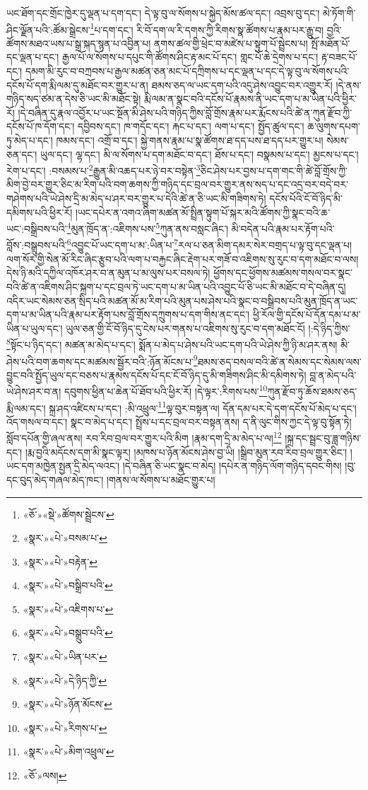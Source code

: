 ཡང་ཐོག་དང་གྲོང་ཁྱེར་དུ་ལྡན་པ་དག་དང་། དེ་ལྟ་བུ་ལ་སོགས་པ་སྐྱེད་མོས་ཚལ་དང་། འབྲས་བུ་དང་། མེ་ཏོག་གི་ཤིང་ལྗོན་པའི་:ཚོམ་སྒྲེངས་\footnote{«ཅོ་»«སྡེ་»ཚོགས་སྦྲེངས་}པ་དག་དང་། རི་བོ་དག་ལ་རི་དགས་ཀྱི་རིགས་སྣ་ཚོགས་པ་རྣམ་པར་རྒྱུ་བ། བྱའི་ཚོགས་མཐའ་ཡས་པ་སྒྲ་སྐད་སྙན་པ་འབྱིན་པ། ནགས་ཚལ་གྱི་ཕྲེང་བ་མཛེས་པ་སྟུག་པོ་སྦྲེངས་པ། སྤོ་མཐོན་པོ་དང་ལྡན་པ་དང་། རྒྱལ་པོ་ལ་སོགས་པ་དཔུང་གི་ཚོགས་ཤིང་རྟ་མང་པོ་དང་། གླང་པོ་ཆེ་དྲེགས་པ་དང་། རྟ་བཟང་པོ་དང་། དམག་མི་རུང་བ་བཀྲབས་པ་རྒྱལ་མཚན་ཅན་མང་པོ་དཀྲིགས་པ་དང་ལྡན་པ་དང་དེ་ལྟ་བུ་ལ་སོགས་པའི་དངོས་པོ་དག་རྨི་ལམ་དུ་མཐོང་བར་གྱུར་པ་ན། ཐམས་ཅད་ལ་ཡང་དག་པའི་འདུ་ཤེས་འབྱུང་བར་འགྱུར་རོ། །དེ་ནས་གཉིད་སད་ཙམ་ན་དེས་ཅི་ཡང་མི་མཐོང་སྟེ། རྨི་ལམ་ན་སྣང་བའི་དངོས་པོ་རྣམས་ནི་ཡང་དག་པ་མ་ཡིན་པའི་ཕྱིར་རོ། །དེ་བཞིན་དུ་རྣལ་འབྱོར་པ་ཡང་སྔོན་མི་ཤེས་པའི་གཉིད་ཀྱིས་བློ་གྲོས་རྣམ་པར་རྨོངས་པའི་ཚེ་ན་ཀུན་རྫོབ་ཀྱི་དངོས་པོ་ཁ་དོག་དང་། དབྱིབས་དང་། ཁ་གདོང་དང་། རྐང་པ་དང་། ལག་པ་དང་། སྤྱོད་ཚུལ་དང་། ཆ་ལུགས་དཔག་ཏུ་མེད་པ་དང་། ཁམས་དང་། འགྲོ་བ་དང་། སྐྱེ་གནས་རྣམ་པ་སྣ་ཚོགས་ཐ་དད་པས་ཐ་དད་པར་གྱུར་པ། སེམས་ཅན་དང་། ཡུལ་དང་། ལྷ་དང་། མི་ལ་སོགས་པ་དག་མཐོང་བ་དང་། ཐོས་པ་དང་། བསྣམས་པ་དང་། མྱངས་པ་དང་། རེག་པ་དང་། :བསམས་པ་\footnote{«སྣར་»«པེ་»བསམ་པ་}རྒྱུན་མི་འཆད་པར་ཉེ་བར་བསྟེན་\footnote{«སྣར་»«པེ་»བརྟེན་}ཅིང་ཤེས་པར་བྱས་པ་དག་གང་གི་ཚེ་བློ་གྲོས་ཀྱི་མིག་བྱེ་བར་གྱུར་ཅིང་མ་རིག་པའི་བག་ཆགས་ཀྱི་གཉིད་དང་བྲལ་བར་གྱུར་ནས་སད་པ་དང་འདྲ་བར་བདེ་བར་གཤེགས་པའི་ཡེ་ཤེས་དྲི་མ་མེད་པ་ཤར་བར་གྱུར་པ་དེའི་ཚེ་ན་ཅི་ཡང་མི་གཟིགས་ཏེ། དངོས་པོའི་ངོ་བོ་ཉིད་མི་དམིགས་པའི་ཕྱིར་རོ། །ཡང་དཔེར་ན་འགའ་ཞིག་མཚན་མོ་སྤྲིན་སྟུག་པོ་སྐར་མའི་ཚོགས་ཀྱི་སྣང་བའི་ཆ་ཡང་:བསྒྲིབས་པའི་\footnote{«སྣར་»«པེ་»བསྒྲིབ་པའི་}མུན་ཁྲོད་ན་:འཇིགས་པས་\footnote{«སྣར་»«པེ་»འཇིགས་པ་}ཀུན་ནས་བསླང་ཞིང་། མི་བདེན་པའི་རྣམ་པར་རྟོག་པའི་བློས་:བསྒྲུབས་པའི་\footnote{«སྣར་»«པེ་»བསྒྲུབ་པའི་}འབྱུང་པོ་ཡང་དག་པ་མ་:ཡིན་པ་\footnote{«སྣར་»«པེ་»ཡིན་པར་}རལ་པ་ཅན་མིག་དམར་སེར་བགྲད་པ་ལྟ་བུ་དང་ལྡན་པ། ལག་སོར་གྱི་སེན་མོ་རིང་ཞིང་རྩུབ་པའི་ལག་པ་བརྐྱང་ཞིང་རྡེག་པར་གཟོ་བ་འཇིགས་སུ་རུང་བ་དག་མཐོང་བ་ལས། དེས་ཉི་མའི་དཀྱིལ་འཁོར་ཤར་བ་ན་མུན་པ་མ་ལུས་པར་བསལ་ཏེ། ཕྱོགས་དང་ཕྱོགས་མཚམས་གསལ་བར་སྣང་བའི་ཚེ་ན་འཇིགས་ཤིང་སྐྲག་པ་དང་བྲལ་ཏེ་ཡང་དག་པ་མ་ཡིན་པའི་འབྱུང་པོ་ཅི་ཡང་མི་མཐོང་བ་དེ་བཞིན་དུ། འདིར་ཡང་སེམས་ཅན་སྲིད་པའི་མཚན་མོ་མ་རིག་པའི་མུན་པས་ཤེས་པའི་སྣང་བ་བསྒྲིབས་པའི་མུན་ཁྲོད་ན་ཡང་དག་པ་མ་ཡིན་པའི་རྣམ་པར་རྟོག་པས་བློ་གྲོས་དཀྲུགས་པ་དག་གིས་ནང་དང་། ཕྱི་རོལ་གྱི་དངོས་པོ་དོན་དམ་པ་མ་ཡིན་པ་ཡུལ་དང་། ཡུལ་ཅན་གྱི་ངོ་བོ་ཉིད་དུ་ངེས་པར་གནས་པ་འཇིགས་སུ་རུང་བ་དག་མཐོང་ངོ། །:དེ་ཉིད་ཀྱིས་\footnote{«སྣར་»«པེ་»དེ་ཉིད་ཀྱི་}སྟོང་པ་ཉིད་དང་། མཚན་མ་མེད་པ་དང་། སྨོན་པ་མེད་པ་ཤེས་པའི་ཡང་དག་པའི་ཡེ་ཤེས་ཀྱི་ཉི་མ་ཤར་ནས། མི་ཤེས་པའི་བག་ཆགས་དང་མཚམས་སྦྱོར་བའི་:ཉོན་མོངས་པ་\footnote{«སྣར་»«པེ་»ཉོན་མོངས་}ཐམས་ཅད་བསལ་བའི་ཚེ་ན་སེམས་དང་སེམས་ལས་བྱུང་བའི་སྤྱོད་ཡུལ་དང་བཅས་པ་རྣམས་དངོས་པོ་དང་ངོ་བོ་ཉིད་དུ་མི་གཟིགས་ཤིང་མི་དམིགས་ཏེ། བླ་ན་མེད་པའི་ཡེ་ཤེས་ཤར་བ་ན། དབུགས་ཕྱིན་པ་ཆེན་པོ་ཐོབ་པའི་ཕྱིར་རོ། །དེ་ལྟར་:རིགས་པས་\footnote{«སྣར་»«པེ་»རིགས་པ་}ཀུན་རྫོབ་ཏུ་ཆོས་ཐམས་ཅད་རྨི་ལམ་དང་། སྐྲ་ཤད་འཛིངས་པ་དང་། :མི་འཕྲུལ་\footnote{«སྣར་»«པེ་»མིག་འཕྲུལ་}ལྟ་བུར་བསྟན་ལ། དོན་དམ་པར་དེ་དག་དངོས་པོ་མེད་པ་དང་། འོད་གསལ་བ་དང་། སྣང་བ་མེད་པ་དང་། སྤྲོས་པ་དང་བྲལ་བར་བསྟན་ནས། ད་ནི་ལུང་གིས་ཀྱང་དེ་ལྟ་བུ་སྟོན་ཏེ། སློབ་དཔོན་གྱི་ཞལ་ནས། རབ་རིབ་བྲལ་བར་གྱུར་པའི་མིག །རྣམ་དག་དྲི་མ་མེད་པ་ལ།\footnote{«ཅོ་»ལས།} །སྐྲ་དང་སྦྲང་བུ་ཟླ་གཉིས་དང་། །རྨ་བྱའི་མདོངས་དག་མི་སྣང་ལྟར། །མཁས་པ་ཉོན་མོངས་ཤེས་བྱ་ཡི། །སྒྲིབ་མུན་རབ་རིབ་བྲལ་གྱུར་ཅིང་། །ཡང་དག་མཁྱེན་སྤྱན་དྲི་མེད་ལའང་། །དེ་བཞིན་ཅི་ཡང་སྣང་བ་མེད། །དཔེར་ན་གཉིད་ལོག་གཉིད་དབང་གིས། །བུ་དང་བུད་མེད་གཞལ་མེད་ཁང་། །གནས་ལ་སོགས་པ་མཐོང་གྱུར་པ། 